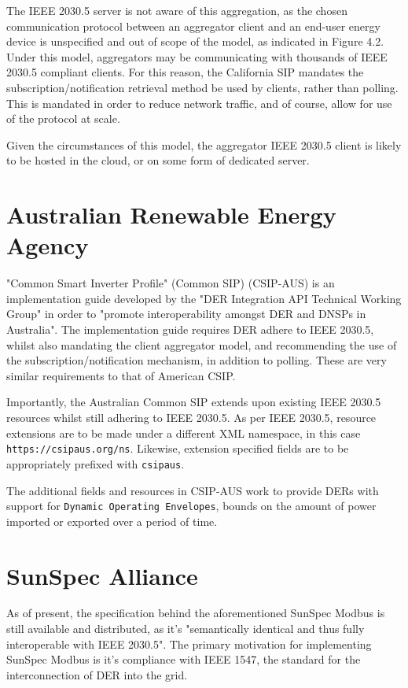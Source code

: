 The IEEE 2030.5 server is not aware of this aggregation, as the chosen communication protocol between an aggregator client and an end-user energy device is unspecified and out of scope of the model, as indicated in Figure 4.2.
Under this model, aggregators may be communicating with thousands of IEEE 2030.5 compliant clients. For this reason, the California SIP mandates the subscription/notification retrieval method be used by clients, rather than polling.
This is mandated in order to reduce network traffic, and of course, allow for use of the protocol at scale.

Given the circumstances of this model, the aggregator IEEE 2030.5 client is likely to be hosted in the cloud, or on some form of dedicated server.


\section{Australian Renewable Energy Agency}
"Common Smart Inverter Profile" (Common SIP) (CSIP-AUS) is an implementation guide developed by the "DER Integration API Technical Working Group" in order to "promote interoperability amongst DER and DNSPs in Australia".
The implementation guide requires DER adhere to IEEE 2030.5, whilst also mandating the client aggregator model, and recommending the use of the subscription/notification mechanism, in addition to polling. These are very similar requirements to that of American CSIP. \cite[]{CSIPAus}

Importantly, the Australian Common SIP extends upon existing IEEE 2030.5 resources whilst still adhering to IEEE 2030.5.
As per IEEE 2030.5, resource extensions are to be made under a different XML namespace, in this case \texttt{https://csipaus.org/ns}. Likewise, extension specified fields are to be appropriately prefixed with \texttt{csipaus}. 

The additional fields and resources in CSIP-AUS work to provide DERs with support for \texttt{Dynamic Operating Envelopes}, bounds on the amount of power imported or exported over a period of time. \cite[]{CSIPAus}

\section{SunSpec Alliance}

As of present, the specification behind the aforementioned SunSpec Modbus is still available and distributed, as it's "semantically identical and thus fully interoperable with IEEE 2030.5". 
The primary motivation for implementing SunSpec Modbus is it's compliance with IEEE 1547, the standard for the interconnection of DER into the grid. \cite[]{SunSpecModbus}

